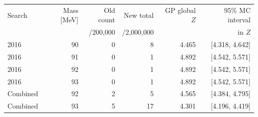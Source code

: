 \begin{tabular}{lrrrrr}\toprule
Search & Mass [MeV] & Old count & New total & GP global $Z$ & 95\% MC interval\\
 & & /200,000 & /2,000,000 & & in $Z$\\\midrule
2016 & 90 & 0 & 8 & 4.465 & [4.318, 4.642]\\
2016 & 91 & 0 & 1 & 4.892 & [4.542, 5.571]\\
2016 & 92 & 0 & 1 & 4.892 & [4.542, 5.571]\\
2016 & 93 & 0 & 1 & 4.892 & [4.542, 5.571]\\
Combined & 92 & 2 & 5 & 4.565 & [4.384, 4.795]\\
Combined & 93 & 5 & 17 & 4.301 & [4.196, 4.419]\\
\bottomrule\end{tabular}
